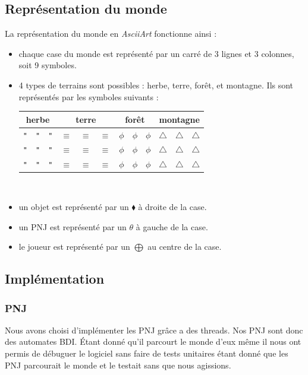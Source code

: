 \documentclass[asi]{picINSA}
\begin{document}
\subsection{Représentation du monde}
La représentation du monde en \textit{AsciiArt} fonctionne ainsi :
\begin{itemize}
\item chaque case du monde est représenté par un carré de 3 lignes et 3 colonnes, soit 9 symboles.
\item 4 types de terrains sont possibles : herbe, terre, forêt, et montagne. Ils sont représentés par les symboles suivants : \\
\begin{tabular}{| c c c | c c c | c c c | c c c | }
 \hline		
  \multicolumn{3}{|c|}{herbe} & \multicolumn{3}{|c|}{terre} & \multicolumn{3}{|c|}{forêt} & \multicolumn{3}{|c|}{montagne} \\	
\hline
    \verb+"+ & \verb+"+ & \verb+"+ & $\equiv$ & $\equiv$ & $\equiv$ & $\phi$ & $\phi$ & $\phi$ & $\triangle$ & $\triangle$ & $\triangle$ \\
    \verb+"+ & \verb+"+ & \verb+"+ & $\equiv$ & $\equiv$ & $\equiv$ & $\phi$ & $\phi$ & $\phi$ & $\triangle$ & $\triangle$ & $\triangle$ \\
    \verb+"+ & \verb+"+ & \verb+"+ & $\equiv$ & $\equiv$ & $\equiv$ & $\phi$ & $\phi$ & $\phi$ & $\triangle$ & $\triangle$ & $\triangle$ \\
 \hline  
 \end{tabular}
~\\
\item un objet est représenté par un $\blacklozenge$ à droite de la case.
\item un PNJ est représenté par un $\theta$ à gauche de la case.
\item le joueur est représenté par un $\bigoplus$ au centre de la case.
\end{itemize}

\subsection{Implémentation}

\subsubsection{PNJ}

Nous avons choisi d'implémenter les PNJ grâce a des threads. Nos PNJ sont donc des automates BDI. Étant donné qu'il parcourt le monde d'eux même il nous ont permis de débuguer le logiciel sans faire de tests unitaires étant donné que les PNJ parcourait le monde et le testait sans que nous agissions. \\
\end{document}
